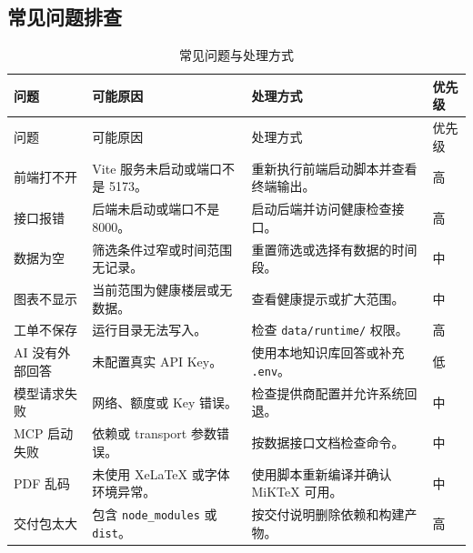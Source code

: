 \documentclass[12pt,a4paper]{ctexart}
\newcommand{\code}[1]{{\footnotesize\nolinkurl{#1}}}
\begin{document}
\subsection{常见问题排查}
\begin{longtable}{L{2.8cm}L{4.0cm}L{5.0cm}L{2.0cm}}
\caption{常见问题与处理方式}\\
\toprule
问题 & 可能原因 & 处理方式 & 优先级 \\
\midrule
\endfirsthead
\toprule
问题 & 可能原因 & 处理方式 & 优先级 \\
\midrule
\endhead
前端打不开 & Vite 服务未启动或端口不是 5173。 & 重新执行前端启动脚本并查看终端输出。 & 高 \\
接口报错 & 后端未启动或端口不是 8000。 & 启动后端并访问健康检查接口。 & 高 \\
数据为空 & 筛选条件过窄或时间范围无记录。 & 重置筛选或选择有数据的时间段。 & 中 \\
图表不显示 & 当前范围为健康楼层或无数据。 & 查看健康提示或扩大范围。 & 中 \\
工单不保存 & 运行目录无法写入。 & 检查 \code{data/runtime/} 权限。 & 高 \\
AI 没有外部回答 & 未配置真实 API Key。 & 使用本地知识库回答或补充 \code{.env}。 & 低 \\
模型请求失败 & 网络、额度或 Key 错误。 & 检查提供商配置并允许系统回退。 & 中 \\
MCP 启动失败 & 依赖或 transport 参数错误。 & 按数据接口文档检查命令。 & 中 \\
PDF 乱码 & 未使用 XeLaTeX 或字体环境异常。 & 使用脚本重新编译并确认 MiKTeX 可用。 & 中 \\
交付包太大 & 包含 \code{node_modules} 或 \code{dist}。 & 按交付说明删除依赖和构建产物。 & 高 \\
\bottomrule
\end{longtable}
\end{document}
